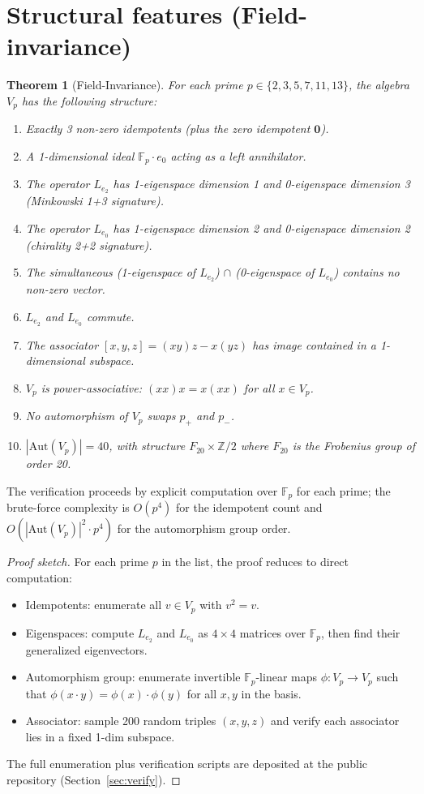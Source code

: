 \documentclass[11pt,reqno]{amsart}
\theoremstyle{plain}
\newtheorem{theorem}{Theorem}[section]
\theoremstyle{definition}
\theoremstyle{remark}
\newcommand{\Z}{\mathbb{Z}}
\newcommand{\F}{\mathbb{F}}
\newcommand{\Aut}{\mathrm{Aut}}
\begin{document}
\section{Structural features (Field-invariance)}

\begin{theorem}[Field-Invariance]\label{thm:dirac-Fp}
For each prime $p \in \{2, 3, 5, 7, 11, 13\}$, the algebra $V_p$ has the
following structure:
\begin{enumerate}
\item Exactly 3 non-zero idempotents (plus the zero idempotent $\mathbf{0}$).
\item A 1-dimensional ideal $\F_p \cdot e_0$ acting as a left annihilator.
\item The operator $L_{e_2}$ has 1-eigenspace dimension 1 and 0-eigenspace
dimension 3 (Minkowski 1+3 signature).
\item The operator $L_{e_0}$ has 1-eigenspace dimension 2 and 0-eigenspace
dimension 2 (chirality 2+2 signature).
\item The simultaneous (1-eigenspace of $L_{e_2}$) $\cap$ (0-eigenspace
of $L_{e_0}$) contains no non-zero vector.
\item $L_{e_2}$ and $L_{e_0}$ commute.
\item The associator $[x, y, z] = (xy)z - x(yz)$ has image contained in
a 1-dimensional subspace.
\item $V_p$ is power-associative: $(xx)x = x(xx)$ for all $x \in V_p$.
\item No automorphism of $V_p$ swaps $p_+$ and $p_-$.
\item $|\Aut(V_p)| = 40$, with structure $F_{20} \times \Z/2$ where
$F_{20}$ is the Frobenius group of order 20.
\end{enumerate}
\end{theorem}

The verification proceeds by explicit computation over $\F_p$ for each
prime; the brute-force complexity is $O(p^4)$ for the idempotent count
and $O(|\Aut(V_p)|^2 \cdot p^4)$ for the automorphism group order.

\begin{proof}[Proof sketch]
For each prime $p$ in the list, the proof reduces to direct computation:
\begin{itemize}
\item Idempotents: enumerate all $v \in V_p$ with $v^2 = v$.
\item Eigenspaces: compute $L_{e_2}$ and $L_{e_0}$ as $4 \times 4$ matrices over $\F_p$, then find their generalized eigenvectors.
\item Automorphism group: enumerate invertible $\F_p$-linear maps $\phi: V_p \to V_p$ such that $\phi(x \cdot y) = \phi(x) \cdot \phi(y)$ for all $x, y$ in the basis.
\item Associator: sample 200 random triples $(x, y, z)$ and verify each associator lies in a fixed 1-dim subspace.
\end{itemize}
The full enumeration plus verification scripts are deposited at the
public repository (Section~\ref{sec:verify}).
\end{proof}
\end{document}
